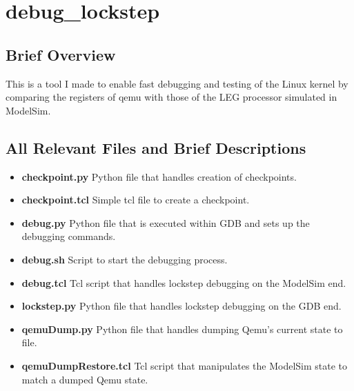 \section{debug\_lockstep}

\subsection{Brief Overview}

This is a tool I made to enable fast debugging and testing of the Linux kernel by comparing the registers of qemu with those of the LEG processor simulated in ModelSim.

\subsection{All Relevant Files and Brief Descriptions}

\begin{itemize}
\item \textbf{checkpoint.py} Python file that handles creation of checkpoints.
\item \textbf{checkpoint.tcl} Simple tcl file to create a checkpoint.
\item \textbf{debug.py} Python file that is executed within GDB and sets up the debugging commands.
\item \textbf{debug.sh} Script to start the debugging process.
\item \textbf{debug.tcl} Tcl script that handles lockstep debugging on the ModelSim end.
\item \textbf{lockstep.py} Python file that handles lockstep debugging on the GDB end.
\item \textbf{qemuDump.py} Python file that handles dumping Qemu's current state to file.
\item \textbf{qemuDumpRestore.tcl} Tcl script that manipulates the ModelSim state to match a dumped Qemu state.
\end{itemize}

